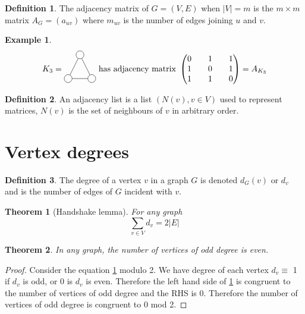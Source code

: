 \documentclass{article}
\newtheorem*{thm}{Theorem}
\theoremstyle{definition}
\newtheorem*{defn}{Definition}
\newtheorem*{ex}{Example}
\begin{document}
\begin{defn}
The adjacency matrix of $G = (V,E)$ when $|V| = m$ is the $m\times m$ matrix $A_G = (a_{uv})$ where $m_{uv}$ is the number of edges joining $u$ and $v$.
\end{defn}

\begin{ex}
$$K_3 = 
\begin{tikzpicture}[baseline=2ex]
  \node[draw,circle] (G-1) at (-0.5,0) {};
  \node[draw,circle] (G-2) at (0.5,0) {};
  \node[draw,circle] (G-3) at (0,1) {};
  \draw (G-1) -- (G-2) -- (G-3) -- (G-1);
\end{tikzpicture}
\text{ has adjacency matrix }
\begin{pmatrix}
0 && 1 && 1 \\
1 && 0 && 1 \\
1 && 1 && 0 
\end{pmatrix} = A_{K_{3}}$$
\end{ex}

\begin{defn}
An adjacency list is a list $(N(v),v\in V)$ used to represent matrices, $N(v)$ is the set of neighbours of $v$ in arbitrary order.
\end{defn}

\section{Vertex degrees}

\begin{defn}
The degree of a vertex $v$ in a graph $G$ is denoted $d_G(v)$ or $d_v$ and is the number of edges of $G$ incident with $v$.
\end{defn}

\begin{thm}[Handshake lemma]
For any graph
\label{eq:hand}
\begin{equation}
\sum_{v\in V}d_v = 2|E|
\end{equation}
\end{thm}

\begin{thm}
In any graph, the number of vertices of odd degree is even.
\end{thm}

\begin{proof}
Consider the equation \ref{eq:hand} modulo 2.
We have degree of each vertex $d_v \equiv$ 1 if $d_v$ is odd, or 0 is $d_v$ is even.
Therefore the left hand side of \ref{eq:hand} is congruent to the number of vertices of odd degree and the RHS is 0.
Therefore the number of vertices of odd degree is congruent to 0 mod 2.
\end{proof}
\end{document}
